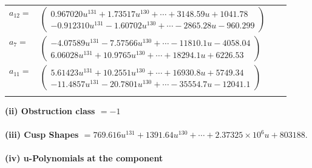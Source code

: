 \documentclass[1p]{elsarticle_modified}
\theoremstyle{definition}
\begin{document}
\begin{tabular}{m{7pt} m{180pt} m{7pt} m{180pt} }
\flushright $a_{12}=$&$\begin{pmatrix}0.967020 u^{131}+1.73517 u^{130}+\cdots+3148.59 u+1041.78\\-0.912310 u^{131}-1.60702 u^{130}+\cdots-2865.28 u-960.299\end{pmatrix}$ \\
\flushright $a_{7}=$&$\begin{pmatrix}-4.07589 u^{131}-7.57566 u^{130}+\cdots-11810.1 u-4058.04\\6.06028 u^{131}+10.9765 u^{130}+\cdots+18294.1 u+6226.53\end{pmatrix}$ \\
\flushright $a_{11}=$&$\begin{pmatrix}5.61423 u^{131}+10.2551 u^{130}+\cdots+16930.8 u+5749.34\\-11.4857 u^{131}-20.7801 u^{130}+\cdots-35554.7 u-12041.1\end{pmatrix}$\\&\end{tabular}
\flushleft \textbf{(ii) Obstruction class $= -1$}\\~\\
\flushleft \textbf{(iii) Cusp Shapes $= 769.616 u^{131}+1391.64 u^{130}+\cdots+2.37325\times10^{6} u+803188.$}\\~\\
\newpage\renewcommand{\arraystretch}{1}
\flushleft \textbf{(iv) u-Polynomials at the component}\newline \\
\end{document}
